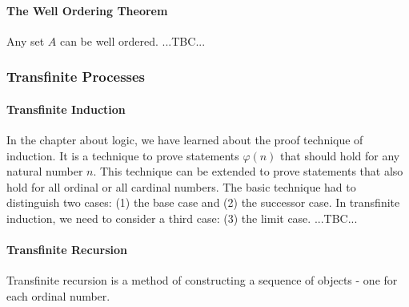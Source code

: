 
\paragraph{The Well Ordering Theorem} 
Any set $A$ can be well ordered. ...TBC...

\subsubsection{Transfinite Processes}

\paragraph{Transfinite Induction}
In the chapter about logic, we have learned about the proof technique of induction. It is a technique to prove statements $\varphi(n)$ that should hold for any natural number $n$. This technique can be extended to prove statements that also hold for all ordinal or all cardinal numbers. The basic technique had to distinguish two cases: (1) the base case and (2) the successor case. In transfinite induction, we need to consider a third case: (3) the limit case. ...TBC...



\paragraph{Transfinite Recursion}
Transfinite recursion is a method of constructing a sequence of objects - one for each ordinal number.






